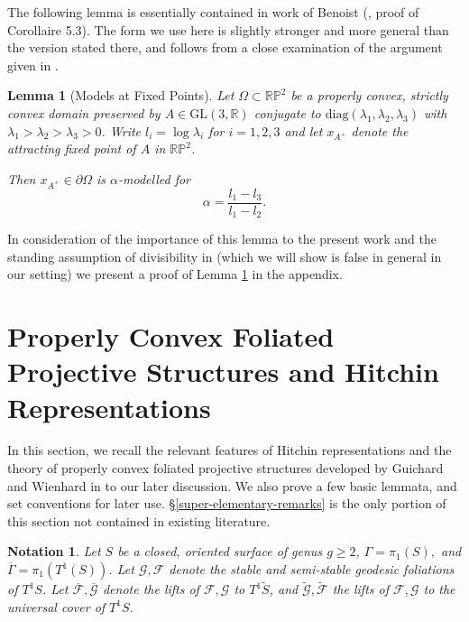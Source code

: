 \documentclass[12pt,a4paper]{amsart}
\theoremstyle{definition}
\theoremstyle{plain}
\newtheorem{lemma}[theorem]{Lemma}
\newtheorem*{notation}{Notation}
\numberwithin{equation}{section}
\begin{document}
The following lemma is essentially contained in work of Benoist (\cite{benoist2004convexesI}, proof of Corollaire 5.3). The form we use here is slightly stronger and more general than the version stated there, and follows from a close examination of the argument given in \cite{benoist2004convexesI}. 

\begin{lemma}[Models at Fixed Points]\label{regularity-lemma} Let $\Omega \subset \mathbb{RP}^2$ be a properly convex, strictly convex domain preserved by {\rm{$A\in \text{GL}(3, \mathbb{R})$}} conjugate to {\rm$\text{diag}(\lambda_1, \lambda_2, \lambda_3)$} with $\lambda_1 > \lambda_2 > \lambda_3 > 0$. Write $l_i = \log \lambda_i $ for $i = 1,2,3$ and let $x_{A^+}$ denote the attracting fixed point of $A$ in $\mathbb{RP}^2$.

Then $x_{A^+} \in \partial \Omega$ is $\alpha$-modelled for $$\alpha = \frac{l_1 - l_3}{l_1 - l_2}.$$
\end{lemma} 

In consideration of the importance of this lemma to the present work and the standing assumption of divisibility in \cite{benoist2004convexesI} (which we will show is false in general in our setting) we present a proof of Lemma \ref{regularity-lemma} in the appendix.


\section{Properly Convex Foliated Projective Structures and Hitchin Representations}\label{convex-projective-structures-background}

In this section, we recall the relevant features of Hitchin representations and the theory of properly convex foliated projective structures developed by Guichard and Wienhard in \cite{guichard2008convex} to our later discussion. We also prove a few basic lemmata, and set conventions for later use. \S \ref{super-elementary-remarks} is the only portion of this section not contained in existing literature.

\begin{notation} Let $S$ be a closed, oriented surface of genus $g \geq 2$, $\Gamma = \pi_1(S),$ and $\overline{\Gamma} = \pi_1(T^1(S))$. Let $\mathcal{G}, \mathcal{F}$ denote the stable and semi-stable geodesic foliations of $T^1S$. Let $\overline{\mathcal{F}}, \overline{\mathcal{G}}$ denote the lifts of $\mathcal{F}, \mathcal{G}$ to $T^1 \widetilde{S}$, and $\widetilde{\mathcal{G}}, \widetilde{\mathcal{F}}$ the lifts of $\mathcal{F}, \mathcal{G}$ to the universal cover of $T^1S$.
\end{notation}
\end{document}
